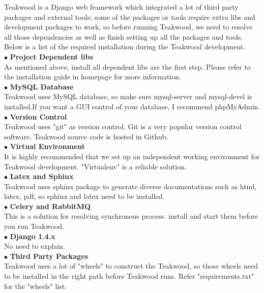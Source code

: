 Teakwood is a Django web framework which integrated a lot of third party packages and external tools; some of the packages or tools require extra libs and development packages to work, so before running Teakwood, we need to resolve all those dependencies as well as finish setting up all the packages and tools. Below is a list of the required installation during the Teakwood development.\\

$\bullet$ \textbf{Project Dependent libs}\\
As mentioned above, install all dependent libs are the first step. Please refer to the
installation guide in homepage for more information.\\

$\bullet$ \textbf{MySQL Database}\\
Teakwood uses MySQL database, so make sure mysql-server and mysql-devel is installed.If you want a GUI control of your database, I recommend phpMyAdmin. \\

$\bullet$ \textbf{Version Control}\\
Teakwood uses "git" as version control. Git is a very popular version control software. Teakwood source code is hosted in Github.\\

$\bullet$ \textbf{Virtual Environment}\\
It is highly recommended that we set up an independent working environment for Teakwood development. "Virtualenv" is a reliable solution.\\

$\bullet$ \textbf{Latex and Sphinx}\\
Teakwood uses sphinx package to generate diverse documentations such as html, latex, pdf, so sphinx and latex need to be installed.\\

$\bullet$ \textbf{Celery and RabbitMQ}\\
This is a solution for resolving synchronous process. install and start them before you run Teakwood.\\

$\bullet$ \textbf{Django 1.4.x}\\
No need to explain. \\

$\bullet$ \textbf{Third Party Packages}\\
Teakwood uses a lot of "wheels" to construct the Teakwood, so those wheels need to be installed in the right path before Teakwood runs. Refer "requirements.txt" for the "wheels" list.





